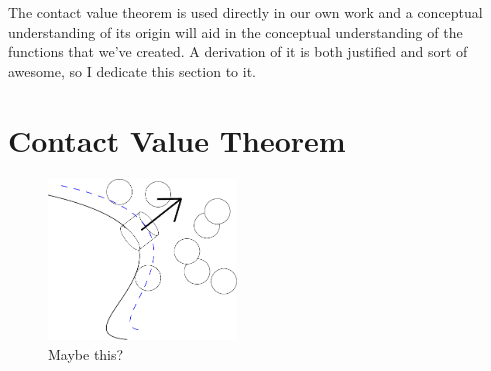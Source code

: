 \clearpage
\newpage

The contact value theorem is used directly in our own work and a
conceptual understanding of its origin will aid in the conceptual
understanding of the functions that we've created.  A derivation of it
is both justified and sort of awesome, so I dedicate this section to
it.

\section{Contact Value Theorem}
\begin{figure}
  \includegraphics[width=5cm]{contact_one}
  \caption{Maybe this?}
  \label{fig:contact}
\end{figure}

